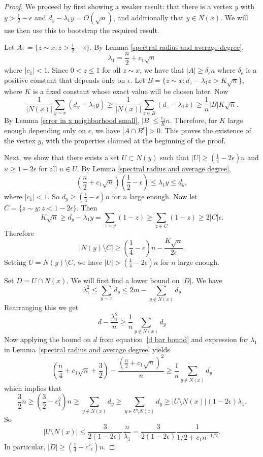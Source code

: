 \begin{proof}
We proceed by first showing a weaker result: that there is a vertex $y$ with
$y> \frac{1}{2} - \epsilon$ and $d_y - \lambda_1 y = O(\sqrt{n})$, and 
additionally that $y \in N(x)$.  We will use then use this to bootstrap
the required result.


Let $A: = \{z\sim x: z> \frac{1}{2} - \epsilon\}$. By Lemma \ref{spectral radius and average degree},
\[
\lambda_1 = \frac{n}{2} + c_1\sqrt{n}
\]
where $|c_1| <1$. Since $0< z\leq 1$ for all $z\sim x$, we have that $|A| \geq \delta_\epsilon n$ where $\delta_\epsilon$ is a positive constant that depends only on $\epsilon$. Let $B = \{z\sim x: d_z - \lambda_1 z >  K\sqrt{n}\}$, where $K$ is a fixed constant whose exact value will be chosen later. Now
\[
\frac{1}{|N(x)|} \sum_{y\sim x} \left( d_y -\lambda_1 y \right) \geq \frac{1}{|N(x)|} \sum_{z\in B} \left( d_z - \lambda_1 z \right) \geq \frac{1}{n} |B| K\sqrt{n}.
\]
By Lemma \ref{error in x neighborhood small}, $|B| \leq \frac{c_3}{K} n$. Therefore, for $K$ large enough depending only on $\epsilon$, we have $\left|A\cap B^c\right| > 0$.  This proves the existence of the vertex $y$,
with the properties claimed at the beginning of the proof.


Next, we show that there exists a set $U\subset N(y)$ such that 
$|U| \geq \left(\frac{1}{4} - 2\epsilon \right)n$ and 
$u \geq 1-2\epsilon$ for all $u\in U$.  By Lemma \ref{spectral radius and average degree},
\[
\left(\frac{n}{2} + c_1\sqrt{n}\right)\left(\frac{1}{2} - \epsilon\right) \leq \lambda_1 y \leq d_y,
\]
where $|c_1| < 1$. So $d_y \geq \left(\frac{1}{4} - \epsilon \right) n$ for $n$ large enough. Now let $C = \{z\sim y: z < 1-2\epsilon \}$. Then
\[
K \sqrt{n} \geq d_y - \lambda_1 y = \sum_{z\sim y} \left( 1 - z \right) \geq \sum_{z\in C} \left( 1-z \right) \geq 2|C| \epsilon.
\]
Therefore
\[
|N(y) \setminus C| \geq \left(\frac{1}{4} - \epsilon\right)n  - \frac{K \sqrt{n}}{2\epsilon}.
\]
Setting $U = N(y) \setminus C$, we have $|U| > \left(\frac{1}{4} - 2\epsilon\right)n$ for $n$ large enough. 


Set $D = U \cap N(x)$.  We will first find a lower bound on $|D|$.  We have
 \begin{equation*}
  \lambda_1^2 \leq \sum_{y \sim x} d_y \leq 2m - \sum_{y \not \in N(x)} d_y
 \end{equation*}
Rearranging this we get 
 \[ d - \frac{\lambda_1^2}{n} \geq \frac{1}{n} \sum_{y \not \in N(x)} d_y\]
Now applying the bound on $d$ from equation~\ref{d bar bound} and expression for $\lambda_1$ in Lemma~\ref{spectral radius and average degree} yields
 \[ \left( \frac{n}{4} + c_1 \sqrt{n} + \frac{3}{2}\right) - \frac{\left(\frac{n}{2} + c_1 \sqrt{n}\right)^2}{n} \geq \frac{1}{n} \sum_{y \not \in N(x)} d_y \]
which implies that
 \[ \frac{3}{2} n \geq \left( \frac{3}{2} - c_1^2 \right) n \geq \sum_{y \not \in N(x)} d_y \geq \sum_{y \in U\setminus N(x)} d_y \geq |U\setminus N(x)| (1-2\epsilon) \lambda_1 .\]
So 
 \[ |U \setminus N(x)| \leq \frac{3}{2(1-2\epsilon)} \frac{n}{\lambda_1} = \frac{3}{2(1-2\epsilon)} \frac{1}{1/2 + c_1 n^{-1/2}} .\]
In particular, $|D| \geq (\frac{1}{4} - c'_\epsilon) n$.


\end{proof}
